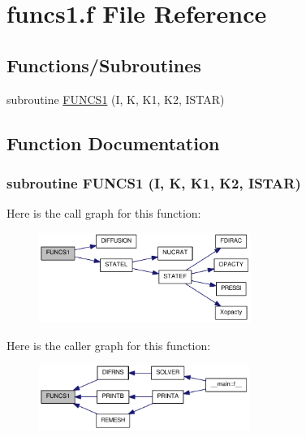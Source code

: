 \hypertarget{funcs1_8f}{
\section{funcs1.f File Reference}
\label{funcs1_8f}
}
\subsection*{Functions/Subroutines}
\begin{DoxyCompactItemize}
\item 
subroutine \hyperlink{funcs1_8f_a823aa25095ced47754832afa9117994a}{FUNCS1} (I, K, K1, K2, ISTAR)
\end{DoxyCompactItemize}


\subsection{Function Documentation}
\hypertarget{funcs1_8f_a823aa25095ced47754832afa9117994a}{
\subsubsection[{FUNCS1}]{\setlength{\rightskip}{0pt plus 5cm}subroutine FUNCS1 (I, \/  K, \/  K1, \/  K2, \/  ISTAR)}}
\label{funcs1_8f_a823aa25095ced47754832afa9117994a}


Here is the call graph for this function:\nopagebreak
\begin{figure}[H]
\begin{center}
\leavevmode
\includegraphics[width=196pt]{funcs1_8f_a823aa25095ced47754832afa9117994a_cgraph}
\end{center}
\end{figure}


Here is the caller graph for this function:\nopagebreak
\begin{figure}[H]
\begin{center}
\leavevmode
\includegraphics[width=194pt]{funcs1_8f_a823aa25095ced47754832afa9117994a_icgraph}
\end{center}
\end{figure}
